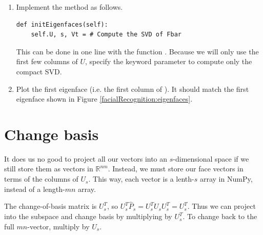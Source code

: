 \begin{problem}
\label{prob:svd}
\leavevmode
\begin{enumerate}
\item Implement the method  as follows.
\begin{lstlisting}
def initEigenfaces(self):
    self.U, s, Vt = # Compute the SVD of Fbar
\end{lstlisting}
This can be done in one line with the function .
Because we will only use the first few columns of $U$, specify the keyword parameter  to compute only the compact SVD.
\item Plot the first eigenface (i.e. the first column of ).
It should match the first eigenface shown in Figure \ref{facialRecognition:eigenfaces}.
\end{enumerate}
\end{problem}

\section*{Change basis}

It does us no good to project all our vectors into an $s$-dimensional space if we still store them as vectors in $\mathbb{R}^{nm}$. 
Instead, we must store our face vectors in terms of the columns of $U_s$.
This way, each vector is a lenth-$s$ array in NumPy, instead of a length-$mn$ array.

The change-of-basis matrix is $U_s^T$, so $U_s^T\widehat{P}_s = U_s^TU_sU_s^T = U_s^T$. 
Thus we can project into the subspace and change basis by multiplying by $U_s^T$.
To change back to the full $mn$-vector, multiply by $U_s$.


